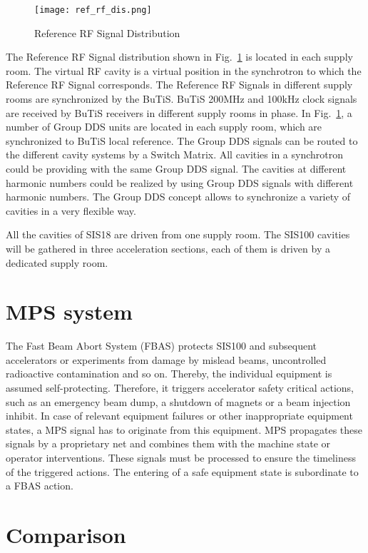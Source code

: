 \begin{figure}[H]
   \centering   
   \texttt{[image: ref\_rf\_dis.png]}
   \caption{Reference RF Signal Distribution}
   \label{ref_rf_dis}
\end{figure}
The Reference RF Signal distribution shown in Fig.~\ref{ref_rf_dis} is located in each supply room. The virtual RF cavity is a virtual position in the synchrotron to which the Reference RF Signal corresponds. The Reference RF Signals in different supply rooms are synchronized by the BuTiS. BuTiS 200MHz and 100kHz clock signals are received by BuTiS receivers in different supply rooms in phase. In Fig.~\ref{ref_rf_dis}, a number of Group DDS units are located in each supply room, which are synchronized to BuTiS local reference. The Group DDS signals can be routed to the different cavity systems by a Switch Matrix. All cavities in a synchrotron could be providing with the same Group DDS signal. The cavities at different harmonic numbers could be realized by using Group DDS signals with different harmonic numbers. The Group DDS concept allows to synchronize a variety of cavities in a very flexible way. 

All the cavities of SIS18 are driven from one supply room. The SIS100 cavities will be gathered in three acceleration sections, each of them is driven by a dedicated supply room. 

\section{\gls{MPS} system}
The Fast Beam Abort System (FBAS) protects SIS100 and subsequent accelerators or experiments from
damage by mislead beams, uncontrolled radioactive contamination and so on. Thereby, the
individual equipment is assumed self-protecting. Therefore, it triggers accelerator safety critical actions, such as an emergency beam dump, a shutdown of magnets or a beam injection
inhibit. In case of relevant equipment failures or other inappropriate equipment states, a MPS signal has to originate from this equipment. MPS propagates these signals by a proprietary net and combines them with the machine state or operator interventions. These signals must be processed to ensure the timeliness of the triggered actions. The entering of a safe equipment state is subordinate to a FBAS action.


\section{Comparison}

